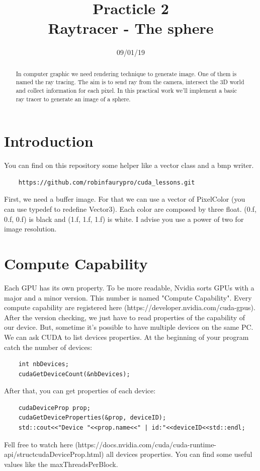 \documentclass{article}
\begin{document}
\title{Practicle 2\\Raytracer - The sphere}
\date{09/01/19}
\maketitle

\begin{abstract}
	In computer graphic we need rendering technique to generate image. One of them is named the ray tracing. The aim is to send ray from the camera, intersect the 3D world and collect information for each pixel. In this practical work we'll implement a basic ray tracer to generate an image of a sphere.
\end{abstract}

\section{Introduction}
You can find on this repository some helper like a vector class and a bmp writer.
\begin{lstlisting}
	https://github.com/robinfaurypro/cuda_lessons.git
\end{lstlisting}
First, we need a buffer image. For that we can use a vector of PixelColor (you can use typedef to redefine Vector3). Each color are composed by three float. (0.f, 0.f, 0.f) is black and (1.f, 1.f, 1.f) is white. I advise you use a power of two for image resolution.

\section{Compute Capability}
Each GPU has its own property. To be more readable, Nvidia sorts GPUs with a major and a minor version. This number is named "Compute Capability". Every compute capability are registered here (https://developer.nvidia.com/cuda-gpus). After the version checking, we just have to read properties of the capability of our device. But, sometime it's possible to have multiple devices on the same PC. We can ask CUDA to list devices properties. At the beginning of your program catch the number of devices:
\begin{lstlisting}
	int nbDevices;
	cudaGetDeviceCount(&nbDevices);
\end{lstlisting}
After that, you can get properties of each device:
\begin{lstlisting}
	cudaDeviceProp prop;
	cudaGetDeviceProperties(&prop, deviceID);
	std::cout<<"Device "<<prop.name<<" | id:"<<deviceID<<std::endl;
\end{lstlisting}
Fell free to watch here (https://docs.nvidia.com/cuda/cuda-runtime-api/structcudaDeviceProp.html) all devices properties. You can find some useful values like the maxThreadsPerBlock. 
\end{document}
